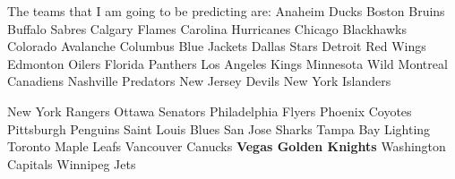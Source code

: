 \documentclass{beamer}
\begin{document}
	\begin{frame}
	The teams that I am going to be predicting are:\newline
	Anaheim Ducks \newline
	Boston Bruins \newline
	Buffalo Sabres \newline
	Calgary Flames \newline
	Carolina Hurricanes \newline
	Chicago Blackhawks \newline
	Colorado Avalanche \newline
	Columbus Blue Jackets \newline
	Dallas Stars \newline 
	Detroit Red Wings \newline
	Edmonton Oilers \newline
	Florida Panthers \newline
	Los Angeles Kings \newline
	Minnesota Wild \newline
	Montreal Canadiens \newline
	Nashville Predators \newline 
	New Jersey Devils \newline
	New York Islanders \newline
	\end{frame}

\begin{frame}
	New York Rangers \newline
	Ottawa Senators \newline
	Philadelphia Flyers \newline
	Phoenix Coyotes \newline
	Pittsburgh Penguins \newline
	Saint Louis Blues \newline
	San Jose Sharks \newline
	Tampa Bay Lighting \newline
	Toronto Maple Leafs \newline
	Vancouver Canucks \newline
	\textbf{Vegas Golden Knights} \newline
	Washington Capitals \newline
	Winnipeg Jets
\end{frame}
\end{document}
